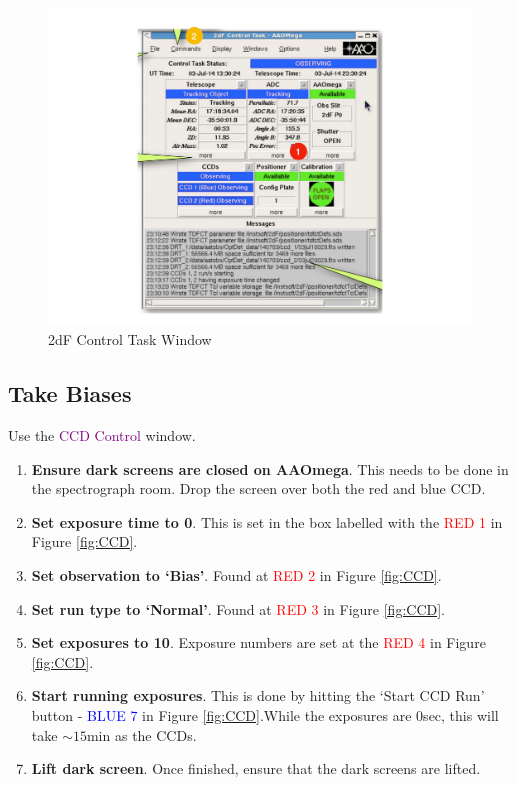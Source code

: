 \documentclass[12pt]{article}
\begin{document}
\begin{figure}
\begin{center}
\includegraphics[scale=0.8]{2DFControlTaskWindow.pdf}
\caption{2dF Control Task Window}
\label{fig:Control}
\end{center}
\end{figure}

\subsection{Take Biases}

\vspace{5mm}


{\large \textsf{Use the {\textcolor{purple}{CCD Control}} window.}}

\begin{enumerate}

\item \textbf{Ensure dark screens are closed on AAOmega}. This needs to be done in the spectrograph room. Drop the screen over both the red and blue CCD.

\item \textbf{Set exposure time to 0}. This is set in the box labelled with the {\textcolor{red}{RED 1}} in Figure \ref{fig:CCD}.

\item \textbf{Set observation to `Bias'}. Found at {\textcolor{red}{RED 2}} in Figure \ref{fig:CCD}.

\item \textbf{Set run type to `Normal'}. Found at {\textcolor{red}{RED 3}} in Figure \ref{fig:CCD}.

\item \textbf{Set exposures to 10}. Exposure numbers are set at the {\textcolor{red}{RED 4}} in Figure \ref{fig:CCD}.

\item \textbf{Start running exposures}. This is done by hitting the `Start CCD Run' button - {\textcolor{blue}{BLUE 7}} in Figure \ref{fig:CCD}.While the exposures are 0sec, this will take $\sim15$min as the CCDs. 

\item \textbf{Lift dark screen}. Once finished, ensure that the dark screens are lifted.

\end{enumerate}
\end{document}
